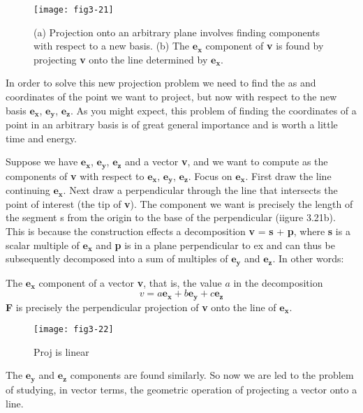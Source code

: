 \documentclass{book}
\begin{document}
\begin{figure}
\begin{center}
\texttt{[image: fig3-21]}
\caption{(a) Projection onto an arbitrary plane involves finding components with respect to a new basis. (b) The $\mathbf{e_x}$ component of \textbf{v} is found by projecting \textbf{v} onto the line determined by $\mathbf{e_x}$.}
\end{center}
\end{figure}

In order to solve this new projection problem we need to find the as and
coordinates of the point we want to project, but now with respect to
the new basis $\mathbf{e_x}$, $\mathbf{e_y}$, $\mathbf{e_z}$. As you might expect, this problem of finding the
coordinates of a point in an arbitrary basis is of great general importance
and is worth a little time and energy.

Suppose we have $\mathbf{e_x}$, $\mathbf{e_y}$, $\mathbf{e_z}$ and a vector \textbf{v}, and we want to compute
as the components of \textbf{v} with respect to $\mathbf{e_x}$, $\mathbf{e_y}$, $\mathbf{e_z}$. Focus on $\mathbf{e_x}$. First draw
the line continuing $\mathbf{e_x}$. Next draw a perpendicular through the line that
intersects the point of interest (the tip of \textbf{v}). The component we want is
precisely the length of the segment s from the origin to the base of the
perpendicular (iigure 3.21b). This is because the construction effects a
decomposition \textbf{v} = \textbf{s} + \textbf{p}, where \textbf{s} is a scalar multiple of $\mathbf{e_x}$ and \textbf{p} is in
a plane perpendicular to ex and can thus be subsequently decomposed
into a sum of multiples of $\mathbf{e_y}$ and $\mathbf{e_z}$. In other words:

The $\mathbf{e_x}$ component of a vector \textbf{v}, that is, the value $a$ in the decomposition
$$v = a\mathbf{e_x} + b\mathbf{e_y} + c\mathbf{e_z}$$
 \textbf{F} is precisely the perpendicular projection of \textbf{v} onto the line of $\mathbf{e_x}$.

\begin{figure}
\begin{center}
\texttt{[image: fig3-22]}
\caption{Proj is linear}
\end{center}
\end{figure}

The $\mathbf{e_y}$ and $\mathbf{e_z}$ components are found similarly. So now we are led to
the problem of studying, in vector terms, the geometric operation of
projecting a vector onto a line.
\end{document}
